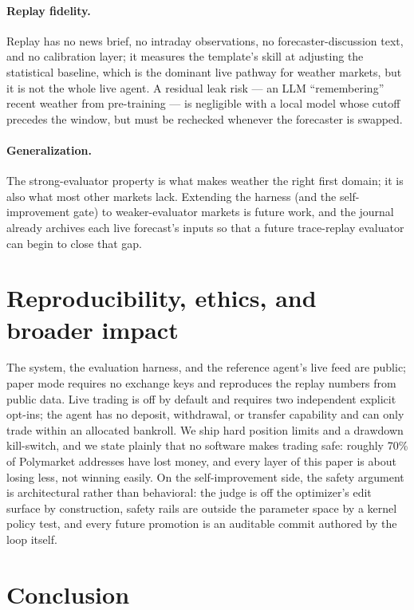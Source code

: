 \documentclass[10pt,twocolumn]{article}
\begin{document}
\paragraph{Replay fidelity.} Replay has no news brief, no intraday observations,
no forecaster-discussion text, and no calibration layer; it measures the
template's skill at adjusting the statistical baseline, which is the dominant live
pathway for weather markets, but it is not the whole live agent. A residual leak
risk --- an LLM ``remembering'' recent weather from pre-training --- is negligible
with a local model whose cutoff precedes the window, but must be rechecked
whenever the forecaster is swapped.

\paragraph{Generalization.} The strong-evaluator property is what makes weather
the right first domain; it is also what most other markets lack. Extending the
harness (and the self-improvement gate) to weaker-evaluator markets is future
work, and the journal already archives each live forecast's inputs so that a
future trace-replay evaluator can begin to close that gap.

\section{Reproducibility, ethics, and broader impact}

The system, the evaluation harness, and the reference agent's live feed are
public; paper mode requires no exchange keys and reproduces the replay numbers
from public data. Live trading is off by default and requires two independent
explicit opt-ins; the agent has no deposit, withdrawal, or transfer capability
and can only trade within an allocated bankroll. We ship hard position limits and
a drawdown kill-switch, and we state plainly that no software makes trading safe:
roughly 70\% of Polymarket addresses have lost money, and every layer of this
paper is about losing less, not winning easily. On the self-improvement side, the
safety argument is architectural rather than behavioral: the judge is off the
optimizer's edit surface by construction, safety rails are outside the parameter
space by a kernel policy test, and every future promotion is an auditable commit
authored by the loop itself.

\section{Conclusion}
\end{document}
